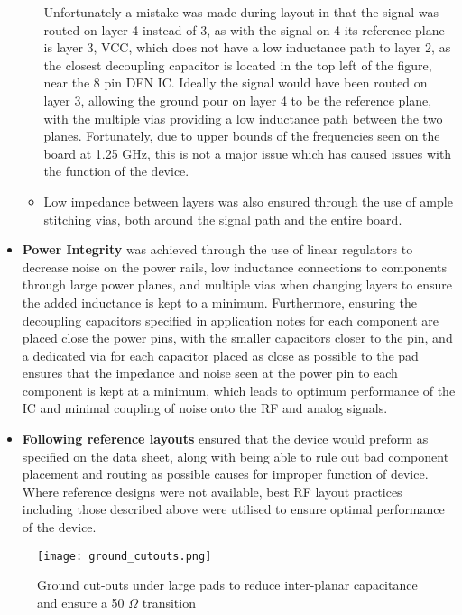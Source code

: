 \begin{itemize}
\begin{itemize}
		Unfortunately a mistake was made during layout in that the signal was routed on layer 4 instead of 3, as with the signal on 4 its reference plane is layer 3, VCC, which does not have a low inductance path to layer 2, as the closest decoupling capacitor is located in the top left of the figure, near the 8 pin DFN IC. Ideally the signal would have been routed on layer 3,  allowing the ground pour on layer 4 to be the reference plane, with the multiple vias providing a low inductance path between the two planes. Fortunately, due to upper bounds of the frequencies seen on the board at 1.25 GHz, this is not a major issue which has caused issues with the function of the device. 
		\item Low impedance between layers was also ensured through the use of ample stitching vias, both around the signal path and the entire board. 
	\end{itemize} 
	\item \textbf{Power Integrity} was achieved through the use of linear regulators to decrease noise on the power rails, low inductance connections to components through large power planes, and multiple vias when changing layers to ensure the added inductance is kept to a minimum. Furthermore, ensuring the decoupling capacitors specified in application notes for each component are placed close the power pins, with the smaller capacitors closer to the pin, and a dedicated via for each capacitor placed as close as possible to the pad ensures that the impedance and noise seen at the power pin to each component is kept at a minimum, which leads to optimum performance of the IC and minimal coupling of noise onto the RF and analog signals.
	\item \textbf{Following reference layouts} ensured that the device would preform as specified on the data sheet, along with being able to rule out bad component placement and routing as possible causes for improper function of device. Where reference designs were not available, best RF layout practices including those described above were utilised to ensure optimal performance of the device.  
\end{itemize} 

\begin{figure}[H]
	\centering
	\texttt{[image: ground\_cutouts.png]}
	\caption{Ground cut-outs under large pads to reduce inter-planar capacitance and ensure a 50 $\Omega$ transition}
	\label{fig:pcb_cap_comp}
\end{figure}

